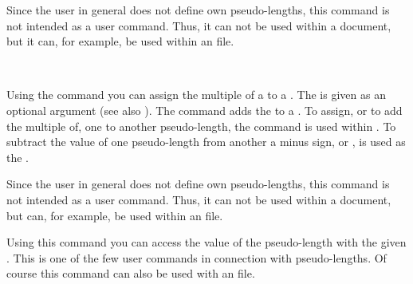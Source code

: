 Since the user in general does not define own pseudo-lengths, this
command is not intended as a user command. Thus, it can not be used
within a document, but it can, for example, be used within an
 file.
%
%

\begin{Declaration}
    \\
\end{Declaration}
%
%
Using the command  you can assign the multiple of a
 to a . The  is given
as an optional argument (see also ). The
command  adds the  to a
. To assign, or to add the multiple of, one
 to another pseudo-length, the command
 is used within .  To subtract the
value of one pseudo-length from another  a minus
sign, or , is used as the .

Since the user in general does not define own pseudo-lengths, this
command is not intended as a user command. Thus, it can not be used
within a document, but can, for example, be used within an 
file.
%
%
%

\begin{Declaration}
\end{Declaration}
%
Using this command you can access the value of the pseudo-length with
the given . This is one of the few user commands in
connection with pseudo-lengths. Of course this command can also be
used with an  file.
%
%

